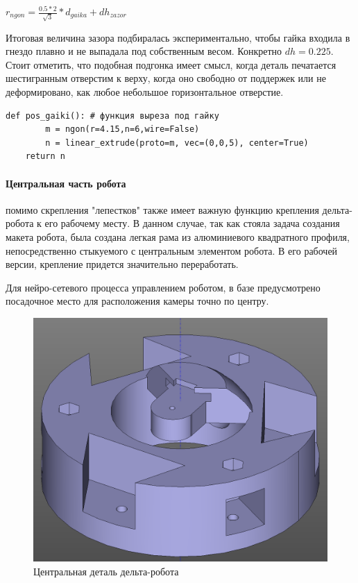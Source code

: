 \begin{center}
    $r_{ngon} = \frac{0.5*2}{\sqrt{3}}*d_{gaika} + dh_{zazor}$
\end{center}

Итоговая величина зазора подбиралась экспериментально, чтобы гайка входила в гнездо плавно и не выпадала под собственным весом. Конкретно $dh=0.225$. Стоит отметить, что подобная подгонка имеет смысл, когда деталь печатается шестигранным отверстим к верху, когда оно свободно от поддержек или не деформировано, как любое небольшое горизонтальное отверстие.  

\begin{lstlisting}[style=python,caption=Линейная развертка (эксрудирование)]
    def pos_gaiki(): # функция выреза под гайку
        m = ngon(r=4.15,n=6,wire=False)
        n = linear_extrude(proto=m, vec=(0,0,5), center=True)
    return n
\end{lstlisting}

\paragraph{Центральная часть робота} помимо скрепления "лепестков" также имеет важную функцию крепления дельта-робота к его рабочему месту. В данном случае, так как стояла задача создания макета робота, была создана легкая рама из алюминиевого квадратного профиля, непосредственно стыкуемого с центральным элементом робота. В его рабочей версии, крепление придется значительно переработать.

Для нейро-сетевого процесса управлением роботом, в базе предусмотрено посадочное место для расположения камеры точно по центру.  
 
\begin{figure}[h!]
\centering
\includegraphics[width=0.8\linewidth]{./image/baza}
\caption{Центральная деталь дельта-робота}
\end{figure} 

